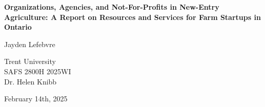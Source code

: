\documentclass{report}
\begin{document}
\begin{titlepage}
    \begin{center}
        \vspace*{1.2cm}

        \textbf{Organizations, Agencies, and Not-For-Profits in New-Entry Agriculture: A Report on Resources and Services for Farm Startups in Ontario}

        \vspace{2cm}

        Jayden Lefebvre\\

        \vspace{5cm}
        
        Trent University\\
        SAFS 2800H 2025WI\\
        Dr. Helen Knibb\\

        \vfill

        February 14th, 2025
        
    \end{center}
\end{titlepage}

\clearpage



\clearpage

\end{document}
